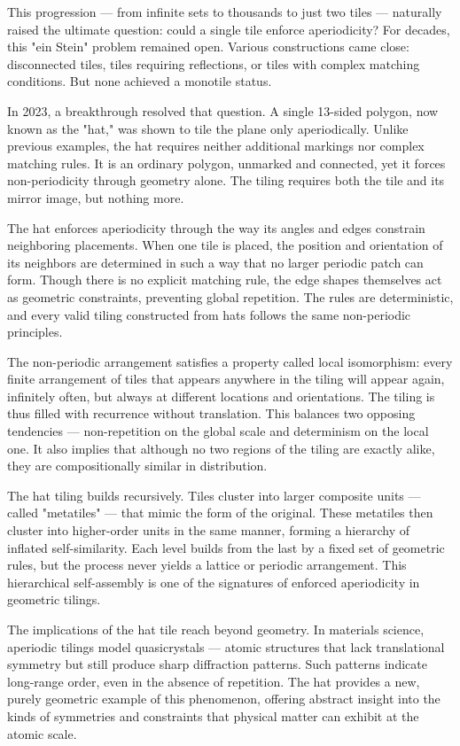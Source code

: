 This progression — from infinite sets to thousands to just two tiles — naturally raised the ultimate question: could a single tile enforce aperiodicity? For decades, this "ein Stein" problem remained open. Various constructions came close: disconnected tiles, tiles requiring reflections, or tiles with complex matching conditions. But none achieved a monotile status.

In 2023, a breakthrough resolved that question. A single 13-sided polygon, now known as the "hat," was shown to tile the plane only aperiodically. Unlike previous examples, the hat requires neither additional markings nor complex matching rules. It is an ordinary polygon, unmarked and connected, yet it forces non-periodicity through geometry alone. The tiling requires both the tile and its mirror image, but nothing more.

The hat enforces aperiodicity through the way its angles and edges constrain neighboring placements. When one tile is placed, the position and orientation of its neighbors are determined in such a way that no larger periodic patch can form. Though there is no explicit matching rule, the edge shapes themselves act as geometric constraints, preventing global repetition. The rules are deterministic, and every valid tiling constructed from hats follows the same non-periodic principles.

The non-periodic arrangement satisfies a property called local isomorphism: every finite arrangement of tiles that appears anywhere in the tiling will appear again, infinitely often, but always at different locations and orientations. The tiling is thus filled with recurrence without translation. This balances two opposing tendencies — non-repetition on the global scale and determinism on the local one. It also implies that although no two regions of the tiling are exactly alike, they are compositionally similar in distribution.

The hat tiling builds recursively. Tiles cluster into larger composite units — called "metatiles" — that mimic the form of the original. These metatiles then cluster into higher-order units in the same manner, forming a hierarchy of inflated self-similarity. Each level builds from the last by a fixed set of geometric rules, but the process never yields a lattice or periodic arrangement. This hierarchical self-assembly is one of the signatures of enforced aperiodicity in geometric tilings.

The implications of the hat tile reach beyond geometry. In materials science, aperiodic tilings model quasicrystals — atomic structures that lack translational symmetry but still produce sharp diffraction patterns. Such patterns indicate long-range order, even in the absence of repetition. The hat provides a new, purely geometric example of this phenomenon, offering abstract insight into the kinds of symmetries and constraints that physical matter can exhibit at the atomic scale.

